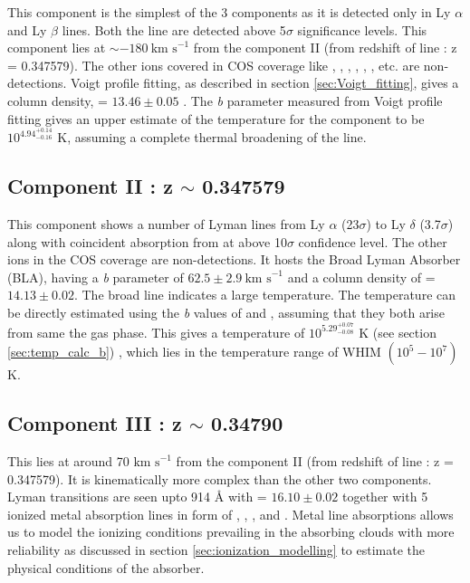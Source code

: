 This component is the simplest of the 3 components as it is detected only in Ly $\alpha$ and Ly $\beta$ lines. Both the line are detected above 5$\sigma$ significance levels. This component lies at $\sim -180 \ \text{km s}^{-1}$ from the component II (from redshift of  line : z = 0.347579). The other ions covered in COS coverage like , , , , , , etc. are non-detections. Voigt profile fitting, as described in section \ref{sec:Voigt_fitting}, gives a  column density,  = $13.46 \pm 0.05$ . The \emph{b} parameter measured from Voigt profile fitting gives an upper estimate of the temperature for the component to be $10^{{4.94}_{-0.16}^{+0.14}}$ K, assuming a complete thermal broadening of the line. 

\subsection{Component II : z $\sim$ 0.347579}

This component shows a number of Lyman lines from Ly $\alpha$ (23$\sigma$) to Ly $\delta$ (3.7$\sigma$) along with coincident absorption from  at above 10$\sigma$ confidence level. The other ions in the COS coverage are non-detections. It hosts the Broad Lyman Absorber (BLA), having a \emph{b} parameter of $62.5 \pm 2.9 \ \text{km s}^{-1}$ and a column density of  = $14.13 \pm 0.02$. The broad line indicates a large temperature. The temperature can be directly estimated using the \emph{b} values of  and , assuming that they both arise from same the gas phase. This gives a temperature of ${10}^{{5.29}_{-0.08}^{+0.07}}$ K (see section \ref{sec:temp_calc_b}) , which lies in the temperature range of WHIM $(10^5-10^7)$ K.   

\subsection{Component III : z $\sim$ 0.34790}

This lies at around 70 $\text{km s}^{-1}$ from the component II (from redshift of  line : z = 0.347579). It is kinematically more complex than the other two components. Lyman transitions are seen upto  914 {\AA} with  = $16.10 \pm 0.02$ together with 5 ionized metal absorption lines in form of , , ,  and . Metal line absorptions allows us to model the ionizing conditions prevailing in the absorbing clouds with more reliability as discussed in section \ref{sec:ionization_modelling} to estimate the physical conditions of the absorber. 


